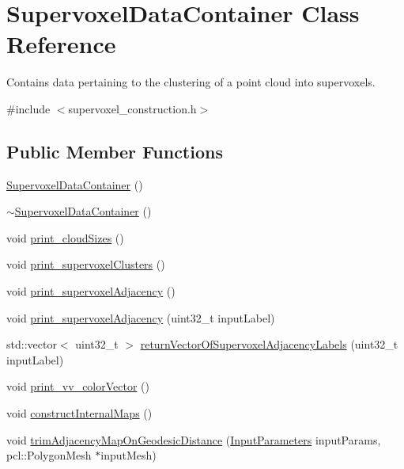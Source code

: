 \hypertarget{classSupervoxelDataContainer}{\section{Supervoxel\-Data\-Container Class Reference}
\label{classSupervoxelDataContainer}
}


Contains data pertaining to the clustering of a point cloud into supervoxels.  




{\ttfamily \#include $<$supervoxel\-\_\-construction.\-h$>$}

\subsection*{Public Member Functions}
\begin{DoxyCompactItemize}
\item 
\hyperlink{classSupervoxelDataContainer_a035aedc42b3d77636faf92524fc3f210}{Supervoxel\-Data\-Container} ()
\item 
\hyperlink{classSupervoxelDataContainer_aecb208c84b94a8df23ff66b19df6258c}{$\sim$\-Supervoxel\-Data\-Container} ()
\item 
void \hyperlink{classSupervoxelDataContainer_af2e6c5567a8c255c77cb1b19a971f6a4}{print\-\_\-cloud\-Sizes} ()
\item 
void \hyperlink{classSupervoxelDataContainer_af9bde74d97bbc6ec290be106e7f8fea4}{print\-\_\-supervoxel\-Clusters} ()
\item 
void \hyperlink{classSupervoxelDataContainer_a95d15d62b141323149ea43bc8164e3e8}{print\-\_\-supervoxel\-Adjacency} ()
\item 
void \hyperlink{classSupervoxelDataContainer_a835cee4a1f0f7707ba4be8c1b11d8fe7}{print\-\_\-supervoxel\-Adjacency} (uint32\-\_\-t input\-Label)
\item 
std\-::vector$<$ uint32\-\_\-t $>$ \hyperlink{classSupervoxelDataContainer_a3d853e7cc4cabec622768ebfb380648d}{return\-Vector\-Of\-Supervoxel\-Adjacency\-Labels} (uint32\-\_\-t input\-Label)
\item 
void \hyperlink{classSupervoxelDataContainer_ac13ff75a5ffe19587bfcb8826cf0bccf}{print\-\_\-vv\-\_\-color\-Vector} ()
\item 
void \hyperlink{classSupervoxelDataContainer_ad7cf2e6bdd359f1481e327aa26e22159}{construct\-Internal\-Maps} ()
\item 
void \hyperlink{classSupervoxelDataContainer_aa0633b596626eef815862fd1ecff8ed4}{trim\-Adjacency\-Map\-On\-Geodesic\-Distance} (\hyperlink{classInputParameters}{Input\-Parameters} input\-Params, pcl\-::\-Polygon\-Mesh $\ast$input\-Mesh)
\end{DoxyCompactItemize}
